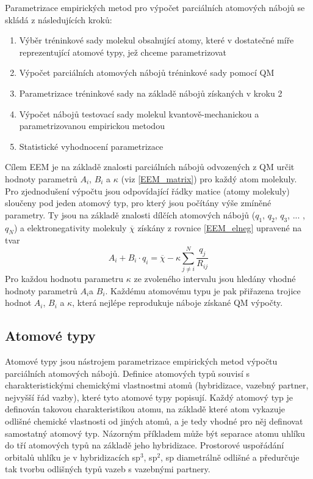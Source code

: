 Parametrizace empirických metod pro výpočet parciálních atomových nábojů se skládá z následujících kroků:

\begin{enumerate}
\itemsep0em
    \item Výběr tréninkové sady molekul obsahující atomy, které v dostatečné míře reprezentující atomové typy, jež chceme parametrizovat
    \item Výpočet parciálních atomových nábojů tréninkové sady pomocí QM
    \item Parametrizace tréninkové sady na základě nábojů získaných v kroku 2
    \item Výpočet nábojů testovací sady molekul kvantově-mechanickou a parametrizovanou empirickou metodou
    \item Statistické vyhodnocení parametrizace
\end{enumerate}

Cílem EEM je na základě znalosti parciálních nábojů odvozených z QM určit hodnoty parametrů $A_i$, $B_i$ a $\kappa$ (viz \ref{EEM_matrix}) pro každý atom molekuly. Pro zjednodušení výpočtu jsou odpovídající řádky matice (atomy molekuly) sloučeny pod jeden atomový typ, pro který jsou počítány výše zmíněné parametry. Ty jsou na základě znalosti dílčích atomových nábojů ($q_1$, $q_2$, $q_3$, ... , $q_N$) a elektronegativity molekuly $\overline{\chi}$ získány z rovnice \ref{EEM_elneg} upravené na tvar 
\begin{equation}
   A_i + B_i\cdot q_i = \overline{\chi} - \kappa \sum_{j \neq i}^{N} \frac{q_j}{R_{ij}}
\end{equation}
Pro každou hodnotu parametru $\kappa$ ze zvoleného intervalu jsou hledány vhodné hodnoty parametrů $A_i$a $B_i$. Každému atomovému typu je pak přiřazena trojice hodnot $A_i$, $B_i$ a $\kappa$, která nejlépe reprodukuje náboje získané QM výpočty.


\subsection{Atomové typy}
Atomové typy jsou nástrojem parametrizace empirických metod výpočtu parciálních atomových nábojů. Definice atomových typů souvisí s charakteristickými chemickými vlastnostmi atomů (hybridizace, vazebný partner, nejvyšší řád vazby), které tyto atomové typy popisují. Každý atomový typ je definován takovou charakteristikou atomu, na základě které atom vykazuje odlišné chemické vlastnosti od jiných atomů, a je tedy vhodné pro něj definovat samostatný atomový typ. Názorným příkladem může být separace atomu uhlíku do tří atomových typů na základě jeho hybridizace. Prostorové uspořádání orbitalů uhlíku je v hybridizacích sp$^3$, sp$^2$, sp diametrálně odlišné a předurčuje tak tvorbu odlišných typů vazeb s vazebnými partnery. 

